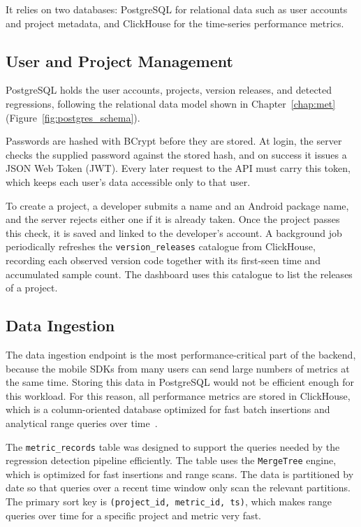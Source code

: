 It relies on two databases: PostgreSQL for relational data such as user accounts and project metadata, and ClickHouse for the time-series performance metrics.

\subsection{User and Project Management}

PostgreSQL holds the user accounts, projects, version releases, and detected regressions, following the relational data model shown in Chapter~\ref{chap:met} (Figure~\ref{fig:postgres_schema}).

Passwords are hashed with BCrypt before they are stored. At login, the server checks the supplied password against the stored hash, and on success it issues a JSON Web Token (JWT). Every later request to the API must carry this token, which keeps each user's data accessible only to that user.


To create a project, a developer submits a name and an Android package name, and the server rejects either one if it is already taken. Once the project passes this check, it is saved and linked to the developer's account. A background job periodically refreshes the \texttt{version\_releases} catalogue from ClickHouse, recording each observed version code together with its first-seen time and accumulated sample count. The dashboard uses this catalogue to list the releases of a project.

\subsection{Data Ingestion}
\label{sec:ingestion}

The data ingestion endpoint is the most performance-critical part of the backend, because the mobile SDKs from many users can send large numbers of metrics at the same time. Storing this data in PostgreSQL would not be efficient enough for this workload. For this reason, all performance metrics are stored in ClickHouse, which is a column-oriented database optimized for fast batch insertions and analytical range queries over time~\cite{schulze2024clickhouse}.

The \texttt{metric\_records} table was designed to support the queries needed by the regression detection pipeline efficiently. The table uses the \texttt{MergeTree} engine, which is optimized for fast insertions and range scans. The data is partitioned by date so that queries over a recent time window only scan the relevant partitions. The primary sort key is \texttt{(project\_id, metric\_id, ts)}, which makes range queries over time for a specific project and metric very fast.

